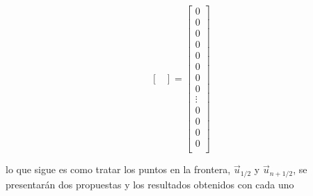 \documentclass[]{article}%
\begin{document}
\begin{equation}
\begin{bmatrix}
\end{bmatrix}
= 
\begin{bmatrix}
0 \\ 0 \\0 \\0\\0 \\0\\0\\0\\
\vdots \\ 
0 \\0\\0\\0\\
\end{bmatrix}
\end{equation}

lo que sigue es como tratar los puntos en la frontera, $\vec{u}_{1/2}$ y $\vec{u}_{n+1/2}$, se presentarán dos propuestas y los resultados obtenidos con cada uno 
\end{document}
